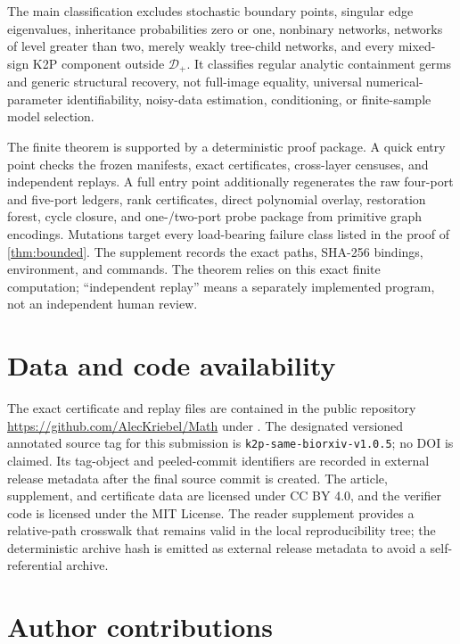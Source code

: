 \documentclass[11pt]{article}
\theoremstyle{remark}
\newcommand{\Dplus}{\mathcal D_+}
\newcommand{\1}{\mathbf 1}
\begin{document}
The main classification excludes stochastic boundary points, singular edge
eigenvalues, inheritance probabilities zero or one, nonbinary networks,
networks of level greater than two, merely weakly tree-child networks, and
every mixed-sign K2P component outside \(\Dplus\).  It classifies regular
analytic containment germs and generic structural recovery, not full-image
equality, universal numerical-parameter identifiability, noisy-data
estimation, conditioning, or finite-sample model selection.

The finite theorem is supported by a deterministic proof package.  A quick
entry point checks the frozen manifests, exact certificates, cross-layer
censuses, and independent replays.  A full entry point additionally regenerates
the raw four-port and five-port ledgers, rank certificates, direct polynomial
overlay, restoration forest, cycle closure, and one-/two-port probe package
from primitive graph encodings.  Mutations target every load-bearing failure
class listed in the proof of \cref{thm:bounded}.  The supplement records the
exact paths, SHA-256 bindings, environment, and commands.  The theorem relies
on this exact finite computation; ``independent replay'' means a separately
implemented program, not an independent human review.

\section*{Data and code availability}

The exact certificate and replay files are contained in the public repository
\url{https://github.com/AlecKriebel/Math} under
.  The designated versioned annotated
source tag for this submission is \texttt{k2p-same-biorxiv-v1.0.5}; no DOI is
claimed.  Its tag-object and peeled-commit identifiers are recorded in
external release metadata after the final source commit is created.  The
article, supplement, and certificate data are licensed under CC BY 4.0, and
the verifier code is licensed under the MIT License.  The reader
supplement provides a relative-path crosswalk that remains valid in the local
reproducibility tree; the deterministic archive hash is emitted as external
release metadata to avoid a self-referential archive.

\section*{Author contributions}
\end{document}
